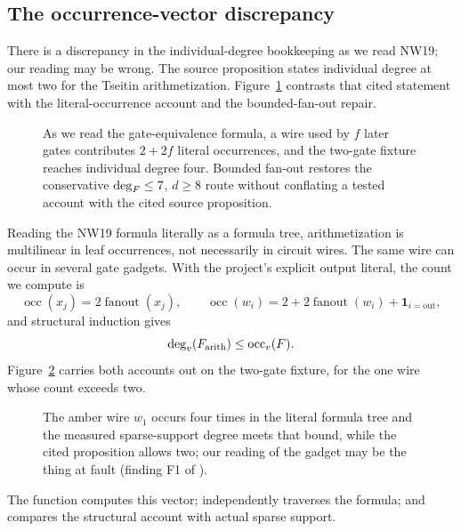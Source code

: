 \subsection{The occurrence-vector discrepancy}

There is a discrepancy in the individual-degree bookkeeping as we read NW19;
our reading may be wrong.  The source proposition states individual degree at
most two for the Tseitin arithmetization.
Figure~\ref{fig:tseitin-fanout} contrasts that cited statement with the
literal-occurrence account and the bounded-fan-out repair.
\begin{figure}[t]
\centering

\caption{As we read the gate-equivalence formula, a wire used by \(f\) later gates contributes \(2+2f\) literal occurrences, and the two-gate fixture reaches individual degree four.  Bounded fan-out restores the conservative \(\operatorname{deg}_F\leq7\), \(d\geq8\) route without conflating a tested account with the cited source proposition.}
\label{fig:tseitin-fanout}
\end{figure}
Reading the NW19 formula literally as a formula tree, arithmetization is
multilinear in leaf occurrences, not necessarily in circuit wires.  The same
wire can occur in several gate gadgets.  With the project's explicit output
literal, the count we compute is
\[
 \operatorname{occ}(x_j)=2\operatorname{fanout}(x_j),\qquad
 \operatorname{occ}(w_i)=2+2\operatorname{fanout}(w_i)
       +\mathbf 1_{i=\mathrm{out}},
\]
and structural induction gives
\[
 \deg_v(F_{\rm arith})\leq \operatorname{occ}_v(F).
\]
Figure~\ref{fig:occurrence-vs-degree} carries both accounts out on the
two-gate fixture, for the one wire whose count exceeds two.
\begin{figure}[H]
\centering

\caption{The amber wire \(w_1\) occurs four times in the literal formula tree and the measured sparse-support degree meets that bound, while the cited proposition allows two; our reading of the gadget may be the thing at fault (finding F1 of ).}
\label{fig:occurrence-vs-degree}
\end{figure}
The function  computes this vector;
 independently traverses the formula; and 
compares the structural account with actual sparse support.

